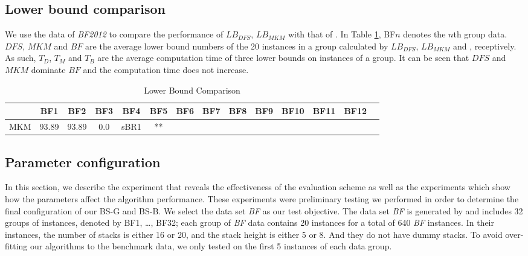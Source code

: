 \documentclass[review,3p,times,authoryear,12pt]{elsarticle}
\begin{document}
\subsection {Lower bound comparison}
We use the data of {\em BF2012} to compare the performance of $LB_{DFS}$, $LB_{MKM}$ with that of \cite{BF2012}. In Table \ref{tab:lowerbound}, BF$n$ denotes the $n$th group data. $DFS$, $MKM$ and $BF$ are the average lower bound numbers of the 20 instances in a group calculated by $LB_{DFS}$, $LB_{MKM}$ and \cite{BF2012}, receptively. As such, $T_D$, $T_M$ and $T_B$ are the average computation time of three lower bounds on instances of a group. It can be seen that $DFS$ and $MKM$ dominate $BF$ and the computation time does not increase.
\begin{table}[htbp]
\centering
\caption{\label{tab:lowerbound} Lower Bound Comparison}
\begin{tabular}{c|c|c|c|c|c|c|c|c|c|c|c|c|c}
\hline
      &   BF1  &  BF2   &  BF3  &  BF4  &  BF5  &  BF6  &  BF7  &  BF8 &  BF9 &BF10&BF11&BF12\\
\hline
MKM   & 93.89  & 93.89  &	 0.0& sBR1  & **&&&&&&&\\
\hline
\end{tabular}
\end{table}

\subsection {Parameter configuration}
\label{sub:config}

In this section, we describe the experiment that reveals the effectiveness of the evaluation scheme as well as the experiments which show how the parameters affect the algorithm performance. These experiments were preliminary testing we performed in order to determine the final configuration of our BS-G and BS-B. We select the data set {\em BF} as our test objective. The data set {\em BF} is generated by \cite{BF2012} and includes 32 groups of instances, denoted by BF1, \dots, BF32; each group of {\em BF} data contains 20 instances for a total of 640 {\em BF} instances. In their instances, the number of stacks is either 16 or 20, and the stack height is either 5 or 8. And they do not have dummy stacks. To avoid over-fitting our algorithms to the benchmark data, we only tested on the first 5 instances of each data group.
\end{document}
